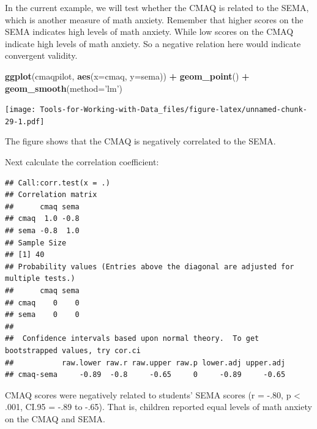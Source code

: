 \documentclass[
]{book}
\newenvironment{Shaded}{\begin{snugshade}}{\end{snugshade}}
\newcommand{\DataTypeTok}[1]{\textcolor[rgb]{0.13,0.29,0.53}{#1}}
\newcommand{\KeywordTok}[1]{\textcolor[rgb]{0.13,0.29,0.53}{\textbf{#1}}}
\newcommand{\NormalTok}[1]{#1}
\newcommand{\OperatorTok}[1]{\textcolor[rgb]{0.81,0.36,0.00}{\textbf{#1}}}
\newcommand{\OtherTok}[1]{\textcolor[rgb]{0.56,0.35,0.01}{#1}}
\newcommand{\StringTok}[1]{\textcolor[rgb]{0.31,0.60,0.02}{#1}}
\begin{document}
In the current example, we will test whether the CMAQ is related to the SEMA, which is another measure of math anxiety. Remember that higher scores on the SEMA indicates high levels of math anxiety. While low scores on the CMAQ indicate high levels of math anxiety. So a negative relation here would indicate convergent validity.

\begin{Shaded}
\begin{Highlighting}[]
\KeywordTok{ggplot}\NormalTok{(cmaqpilot, }\KeywordTok{aes}\NormalTok{(}\DataTypeTok{x=}\NormalTok{cmaq, }\DataTypeTok{y=}\NormalTok{sema)) }\OperatorTok{+}
\StringTok{  }\KeywordTok{geom_point}\NormalTok{() }\OperatorTok{+}
\StringTok{  }\KeywordTok{geom_smooth}\NormalTok{(}\DataTypeTok{method=}\StringTok{'lm'}\NormalTok{)}
\end{Highlighting}
\end{Shaded}

\texttt{[image: Tools-for-Working-with-Data\_files/figure-latex/unnamed-chunk-29-1.pdf]}

The figure shows that the CMAQ is negatively correlated to the SEMA.

Next calculate the correlation coefficient:

\begin{Shaded}
\end{Shaded}

\begin{verbatim}
## Call:corr.test(x = .)
## Correlation matrix 
##      cmaq sema
## cmaq  1.0 -0.8
## sema -0.8  1.0
## Sample Size 
## [1] 40
## Probability values (Entries above the diagonal are adjusted for multiple tests.) 
##      cmaq sema
## cmaq    0    0
## sema    0    0
## 
##  Confidence intervals based upon normal theory.  To get bootstrapped values, try cor.ci
##           raw.lower raw.r raw.upper raw.p lower.adj upper.adj
## cmaq-sema     -0.89  -0.8     -0.65     0     -0.89     -0.65
\end{verbatim}

CMAQ scores were negatively related to students' SEMA scores (r = -.80, p \textless{} .001, CI.95 = -.89 to -.65). That is, children reported equal levels of math anxiety on the CMAQ and SEMA.
\end{document}
